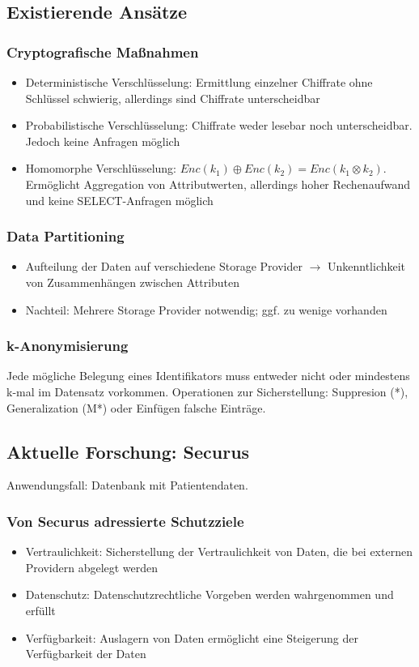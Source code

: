 \subsection{Existierende Ansätze}

\subsubsection{Cryptografische Maßnahmen}
\begin{itemize}
	\item Deterministische Verschlüsselung: Ermittlung einzelner Chiffrate ohne Schlüssel schwierig, allerdings sind Chiffrate unterscheidbar
	\item Probabilistische Verschlüsselung: Chiffrate weder lesebar noch unterscheidbar. Jedoch keine Anfragen möglich
	\item Homomorphe Verschlüsselung: $Enc(k_1) \oplus Enc(k_2) = Enc(k_1 \otimes k_2)$. Ermöglicht Aggregation von Attributwerten, allerdings hoher Rechenaufwand und keine SELECT-Anfragen möglich
\end{itemize}

\subsubsection{Data Partitioning}
\begin{itemize}
	\item Aufteilung der Daten auf verschiedene Storage Provider $\rightarrow$ Unkenntlichkeit von Zusammenhängen zwischen Attributen
	\item Nachteil: Mehrere Storage Provider notwendig; ggf. zu wenige vorhanden
\end{itemize}

\subsubsection{k-Anonymisierung}
Jede mögliche Belegung eines Identifikators muss entweder nicht oder mindestens k-mal im Datensatz vorkommen. Operationen zur Sicherstellung: Suppresion (*), Generalization (M*) oder Einfügen falsche Einträge.


\subsection{Aktuelle Forschung: Securus}
Anwendungsfall: Datenbank mit Patientendaten.

\subsubsection{Von Securus adressierte Schutzziele}
\begin{itemize}
	\item Vertraulichkeit: Sicherstellung der Vertraulichkeit von Daten, die bei externen Providern abgelegt werden
	\item Datenschutz: Datenschutzrechtliche Vorgeben werden wahrgenommen und erfüllt
	\item Verfügbarkeit: Auslagern von Daten ermöglicht eine Steigerung der Verfügbarkeit der Daten
\end{itemize}

